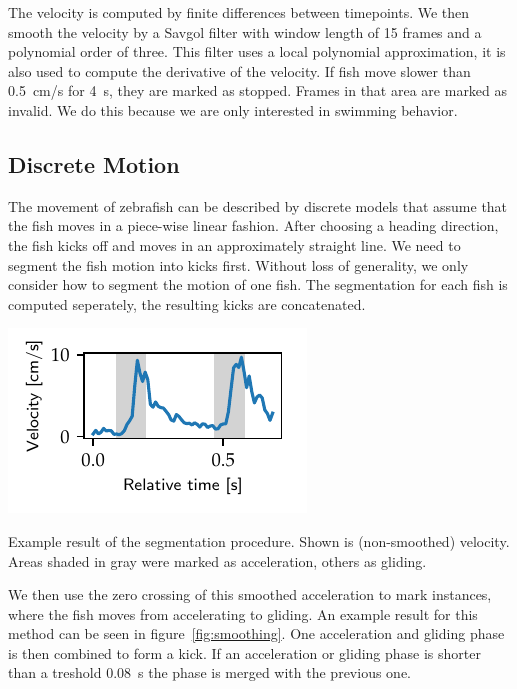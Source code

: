 \documentclass[nobib, a4paper]{tufte-handout}
\begin{document}
The velocity is computed by finite differences between timepoints.
We then smooth the velocity by a Savgol filter with window length of 15 frames and a polynomial order of three.
This filter uses a local polynomial approximation, it is also used to compute the derivative of the velocity.
If fish move slower than \SI{0.5}{\cm/\s} for \SI{4}{\s}, they are marked as stopped.
Frames in that area are marked as invalid.
We do this because we are only interested in swimming behavior.

\subsection{Discrete Motion}
The movement of zebrafish can be described by discrete models that assume that the fish moves in a piece-wise linear fashion.
After choosing a heading direction, the fish kicks off and moves in an approximately straight line.
We need to segment the fish motion into kicks first.
Without loss of generality, we only consider how to segment the motion of one fish.
The segmentation for each fish is computed seperately, the resulting kicks are concatenated.

\begin{marginfigure}
\includegraphics[scale=1]{smoothing}
\caption{Example result of the segmentation procedure.
  Shown is (non-smoothed) velocity.
  Areas shaded in gray were marked as acceleration, others as gliding.
\label{fig:smoothing}}
\end{marginfigure}

We then use the zero crossing of this smoothed acceleration to mark instances, where the fish moves from accelerating to gliding.
An example result for this method can be seen in figure~\ref{fig:smoothing}.
One acceleration and gliding phase is then combined to form a kick.
If an acceleration or gliding phase is shorter than a treshold \SI{0.08}{\s} the phase is merged with the previous one.
\end{document}
